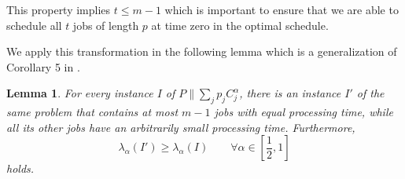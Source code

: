 \documentclass[%
english, titlepage=false %
]{./tum-templates/book/tumbook}
\newtheorem{lemma}{Lemma}
\newcommand{\Problem}{P\!\parallel\!\sum_j p_j C^{\alpha}_j}
\begin{document}
This property implies $t\le m-1$ which is important to ensure that we are able to
schedule all $t$ jobs of length $p$ at time zero in the optimal schedule. 

We apply this transformation in the following lemma which is a generalization of Corollary 5 in \cite{Schwiegelshohn:2011}.

\begin{lemma}\label{corr:same-length-jobs}
For every instance $I$ of $\Problem$,
there is an instance $I'$ of the same problem that
contains at most $m-1$ jobs with equal processing time,
while all its other jobs have an arbitrarily small processing time. Furthermore, 
\[
    \lambda_{\alpha}(I') \geq \lambda_{\alpha}(I)
    \qquad \forall \alpha\in\left[\frac12,1\right]
\]
holds.
\end{lemma}
\end{document}
